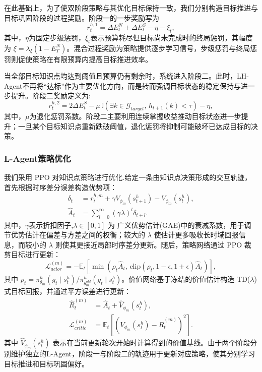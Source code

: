 \documentclass[11pt,a4paper]{article}
\begin{document}
在此基础上，为了使双阶段策略与其优化目标保持一致，我们分别构造目标推进与目标巩固阶段的过程奖励。阶段一的一步奖励写为
\begin{equation}
r_t^{h,1}
=
\Delta E_t^{N}
+
\Delta E_t^{S}
-
\eta
-
\xi_t,
\end{equation}
其中，$\eta$为固定步级惩罚，$\xi_t$表示预算耗尽但目标尚未完成时的终局惩罚，其幅度为 $\xi=\lambda_{\xi}(1-E_T^{N})$。混合过程奖励为策略提供逐步学习信号，步级惩罚与终局惩罚则促使策略在有限预算内提高目标推进效率。

当全部目标知识点均达到阈值且预算仍有剩余时，系统进入阶段二。此时，LH-Agent不再将“达标”作为主要优化方向，而是转而强调目标状态的稳定保持与进一步提升。阶段二奖励定义为:
\begin{equation}
r_t^{h,2}=2\Delta E_t^{S}-
\mu\,\mathbb{I}\!\left(\exists k\in\mathcal{G}_{target},\,h_{t+1}(k)<\tau\right)
-
\eta,
\end{equation}
其中，$\mu$为退化惩罚系数。阶段二主要利用连续掌握收益推动目标状态进一步提升；一旦某个目标知识点重新跌破阈值，退化惩罚将抑制可能破坏已达成目标的决策。

\subsubsection{L-Agent策略优化}

我们采用 PPO 对知识点策略进行优化.给定一条由知识点决策形成的交互轨迹，首先根据时序差分误差构造优势项：
\begin{equation}
\begin{aligned}
\delta_t &= r_t^{h,m}+\gamma V_{\phi_m}(s_{t+1}^h)-V_{\phi_m}(s_t^h),\\
\hat{A}_t &= \sum_{l=0}^{\infty}(\gamma\lambda)^l\delta_{t+l}.
\end{aligned}
\end{equation}
其中，$\gamma$表示折扣因子,$\lambda\in[0,1]$ 为 广义优势估计(GAE)中的衰减系数，用于调节优势估计在偏差与方差之间的权衡；较大的 $\lambda$ 使估计更多吸收长时域回报信息，而较小的 $\lambda$ 则使其更接近局部时序差分更新。随后，策略网络通过 PPO 裁剪目标进行更新：
\begin{equation}
\mathcal{L}_{actor}^{(m)}
=
-\mathbb{E}_t
\left[
\min\left(
\rho_t\hat{A}_t,\,
\mathrm{clip}(\rho_t,1-\epsilon,1+\epsilon)\hat{A}_t
\right)
\right],
\end{equation}
其中 $\rho_t=\pi_{\theta_m}^h(g_t\mid s_t^h)/\pi_{\theta_m^{old}}^h(g_t\mid s_t^h)$。价值网络基于冻结的价值估计构造 TD($\lambda$) 式目标回报，并通过平方误差进行更新：
\begin{equation}
\begin{aligned}
\hat{R}_t^{(m)}
&=\hat{A}_t+\hat{V}_{\phi_m}(s_t^h),\\
\mathcal{L}_{critic}^{(m)}
&=\mathbb{E}_t\!\left[
\left(V_{\phi_m}(s_t^h)-\hat{R}_t^{(m)}\right)^2
\right].
\end{aligned}
\end{equation}
其中 $\hat{V}_{\phi_m}(s_t^h)$ 表示在当前更新轮次开始时计算得到的价值基线。由于两个阶段分别维护独立的L-Agent，阶段一与阶段二的轨迹用于更新对应策略，使其分别学习目标推进和目标巩固偏好。
\end{document}
